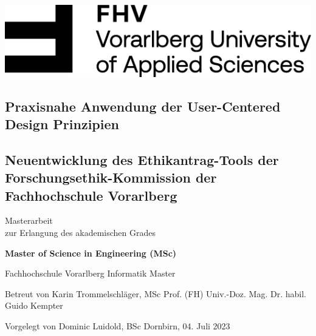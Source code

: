 \documentclass[a4paper,12pt,twoside]{scrreprt}
\begin{document}

\begin{titlepage}
    \begin{flushright}
    \includegraphics[width=0.4\linewidth]{images/FHV_FHV-Logo.png}
    \end{flushright}
    \vspace{1cm}

    \begin{flushleft}
    \section*{Praxisnahe Anwendung der User-Centered Design Prinzipien}
    \subsection*{Neuentwicklung des Ethikantrag-Tools der Forschungsethik-Kommission der Fachhochschule Vorarlberg}
    \vspace{1cm}

    Masterarbeit\\
    zur Erlangung des akademischen Grades
    \vspace{0.5cm}

    \textbf{Master of Science in Engineering (MSc)}

    \vspace{1cm}
    Fachhochschule Vorarlberg\newline
    Informatik Master

    \vspace{0.5cm}

    Betreut von\newline
    Karin Trommelschläger, MSc\newline
    Prof. (FH) Univ.-Doz. Mag. Dr. habil. Guido Kempter

    \vspace{0.5cm}

    Vorgelegt von\newline
    Dominic Luidold, BSc\newline
    Dornbirn, 04. Juli 2023
    \end{flushleft}
\end{titlepage}

\cleardoublepage
{}
\end{document}
